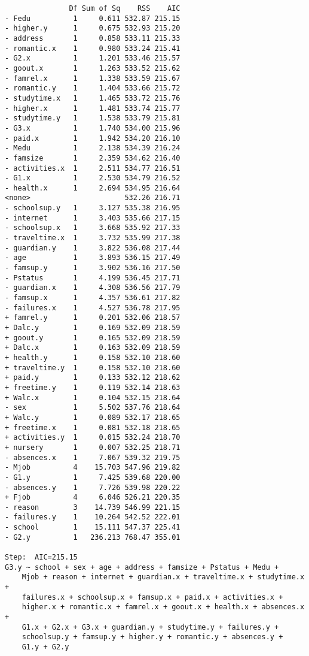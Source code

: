 \documentclass[11pt]{article}
\begin{document}
\begin{enumerate}
\begin{verbatim}
               Df Sum of Sq    RSS    AIC
- Fedu          1     0.611 532.87 215.15
- higher.y      1     0.675 532.93 215.20
- address       1     0.858 533.11 215.33
- romantic.x    1     0.980 533.24 215.41
- G2.x          1     1.201 533.46 215.57
- goout.x       1     1.263 533.52 215.62
- famrel.x      1     1.338 533.59 215.67
- romantic.y    1     1.404 533.66 215.72
- studytime.x   1     1.465 533.72 215.76
- higher.x      1     1.481 533.74 215.77
- studytime.y   1     1.538 533.79 215.81
- G3.x          1     1.740 534.00 215.96
- paid.x        1     1.942 534.20 216.10
- Medu          1     2.138 534.39 216.24
- famsize       1     2.359 534.62 216.40
- activities.x  1     2.511 534.77 216.51
- G1.x          1     2.530 534.79 216.52
- health.x      1     2.694 534.95 216.64
<none>                      532.26 216.71
- schoolsup.y   1     3.127 535.38 216.95
- internet      1     3.403 535.66 217.15
- schoolsup.x   1     3.668 535.92 217.33
- traveltime.x  1     3.732 535.99 217.38
- guardian.y    1     3.822 536.08 217.44
- age           1     3.893 536.15 217.49
- famsup.y      1     3.902 536.16 217.50
- Pstatus       1     4.199 536.45 217.71
- guardian.x    1     4.308 536.56 217.79
- famsup.x      1     4.357 536.61 217.82
- failures.x    1     4.527 536.78 217.95
+ famrel.y      1     0.201 532.06 218.57
+ Dalc.y        1     0.169 532.09 218.59
+ goout.y       1     0.165 532.09 218.59
+ Dalc.x        1     0.163 532.09 218.59
+ health.y      1     0.158 532.10 218.60
+ traveltime.y  1     0.158 532.10 218.60
+ paid.y        1     0.133 532.12 218.62
+ freetime.y    1     0.119 532.14 218.63
+ Walc.x        1     0.104 532.15 218.64
- sex           1     5.502 537.76 218.64
+ Walc.y        1     0.089 532.17 218.65
+ freetime.x    1     0.081 532.18 218.65
+ activities.y  1     0.015 532.24 218.70
+ nursery       1     0.007 532.25 218.71
- absences.x    1     7.067 539.32 219.75
- Mjob          4    15.703 547.96 219.82
- G1.y          1     7.425 539.68 220.00
- absences.y    1     7.726 539.98 220.22
+ Fjob          4     6.046 526.21 220.35
- reason        3    14.739 546.99 221.15
- failures.y    1    10.264 542.52 222.01
- school        1    15.111 547.37 225.41
- G2.y          1   236.213 768.47 355.01

Step:  AIC=215.15
G3.y ~ school + sex + age + address + famsize + Pstatus + Medu + 
    Mjob + reason + internet + guardian.x + traveltime.x + studytime.x + 
    failures.x + schoolsup.x + famsup.x + paid.x + activities.x + 
    higher.x + romantic.x + famrel.x + goout.x + health.x + absences.x + 
    G1.x + G2.x + G3.x + guardian.y + studytime.y + failures.y + 
    schoolsup.y + famsup.y + higher.y + romantic.y + absences.y + 
    G1.y + G2.y


\end{verbatim}
\end{enumerate}
\end{document}
